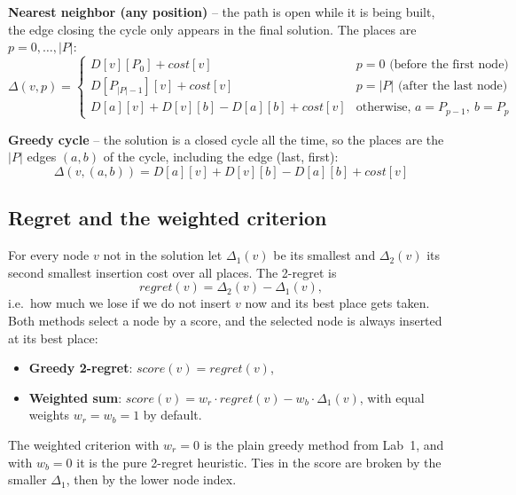 \documentclass[11pt,a4paper]{article}
\begin{document}
\textbf{Nearest neighbor (any position)} -- the path is open while it is being built, the edge
closing the cycle only appears in the final solution. The places are $p = 0, \dots, |P|$:
\[
  \Delta(v, p) =
  \begin{cases}
    D[v][P_0] + \mathit{cost}[v] & p = 0 \text{ (before the first node)}\\
    D[P_{|P|-1}][v] + \mathit{cost}[v] & p = |P| \text{ (after the last node)}\\
    D[a][v] + D[v][b] - D[a][b] + \mathit{cost}[v] & \text{otherwise, } a = P_{p-1},\ b = P_p
  \end{cases}
\]

\textbf{Greedy cycle} -- the solution is a closed cycle all the time, so the places are the
$|P|$ edges $(a, b)$ of the cycle, including the edge (last, first):
\[
  \Delta(v, (a, b)) = D[a][v] + D[v][b] - D[a][b] + \mathit{cost}[v]
\]

\subsection*{Regret and the weighted criterion}
For every node $v$ not in the solution let $\Delta_1(v)$ be its smallest and $\Delta_2(v)$ its
second smallest insertion cost over all places. The 2-regret is
\[
  \mathit{regret}(v) = \Delta_2(v) - \Delta_1(v),
\]
i.e.\ how much we lose if we do not insert $v$ now and its best place gets taken. Both methods
select a node by a score, and the selected node is always inserted at its best place:
\begin{itemize}
  \item \textbf{Greedy 2-regret}: $\mathit{score}(v) = \mathit{regret}(v)$,
  \item \textbf{Weighted sum}: $\mathit{score}(v) = w_r \cdot \mathit{regret}(v) - w_b \cdot \Delta_1(v)$,
        with equal weights $w_r = w_b = 1$ by default.
\end{itemize}
The weighted criterion with $w_r = 0$ is the plain greedy method from Lab~1, and with $w_b = 0$ it is
the pure 2-regret heuristic. Ties in the score are broken by the smaller $\Delta_1$, then by the
lower node index.
\end{document}
